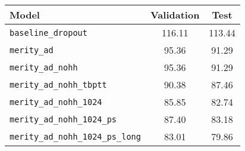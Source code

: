 \begin{tabular}{lcc}
    \toprule
    Model& Validation & Test \\
    \midrule
    \texttt{baseline\_dropout} & 116.11 & 113.44 \\
    \texttt{merity\_ad} & 95.36 & 	91.29 \\
    \texttt{merity\_ad\_nohh} & 95.36 & 91.29 \\
    \texttt{merity\_ad\_nohh\_tbptt} & 90.38 &	87.46 \\
    \texttt{merity\_ad\_nohh\_1024} & 85.85 &	82.74 \\
    \texttt{merity\_ad\_nohh\_1024\_ps} & 87.40 &	83.18 \\
    \texttt{merity\_ad\_nohh\_1024\_ps\_long} & 83.01 &	79.86 \\
    \bottomrule
\end{tabular}
